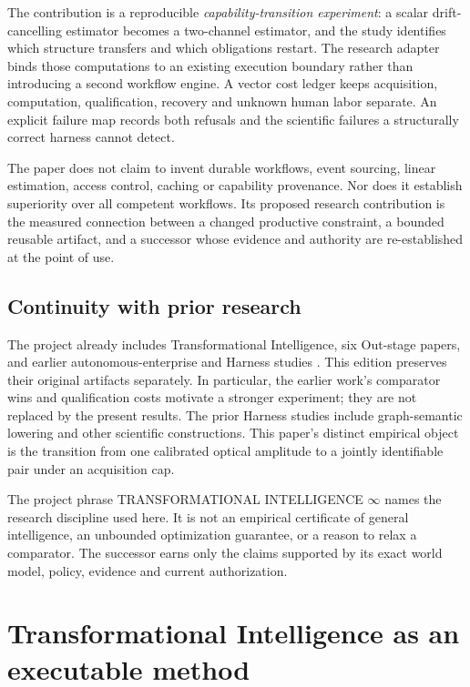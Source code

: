 \documentclass[11pt]{article}
\newcommand{\TI}{TRANSFORMATIONAL INTELLIGENCE $\infty$}
\begin{document}
The contribution is a reproducible \emph{capability-transition experiment}: a scalar drift-cancelling estimator becomes a two-channel estimator, and the study identifies which structure transfers and which obligations restart. The research adapter binds those computations to an existing execution boundary rather than introducing a second workflow engine. A vector cost ledger keeps acquisition, computation, qualification, recovery and unknown human labor separate. An explicit failure map records both refusals and the scientific failures a structurally correct harness cannot detect.

The paper does not claim to invent durable workflows, event sourcing, linear estimation, access control, caching or capability provenance. Nor does it establish superiority over all competent workflows. Its proposed research contribution is the measured connection between a changed productive constraint, a bounded reusable artifact, and a successor whose evidence and authority are re-established at the point of use.

\subsection{Continuity with prior research}

The project already includes Transformational Intelligence, six Out-stage papers, and earlier autonomous-enterprise and Harness studies \cite{ti,outlearn,outthink,outdesign,outstrategise,outexecute,outevolve,priorharness}. This edition preserves their original artifacts separately. In particular, the earlier work's comparator wins and qualification costs motivate a stronger experiment; they are not replaced by the present results. The prior Harness studies include graph-semantic lowering and other scientific constructions. This paper's distinct empirical object is the transition from one calibrated optical amplitude to a jointly identifiable pair under an acquisition cap.

The project phrase \TI{} names the research discipline used here. It is not an empirical certificate of general intelligence, an unbounded optimization guarantee, or a reason to relax a comparator. The successor earns only the claims supported by its exact world model, policy, evidence and current authorization.



\section{Transformational Intelligence as an executable method}
\label{sec:method}
\end{document}
